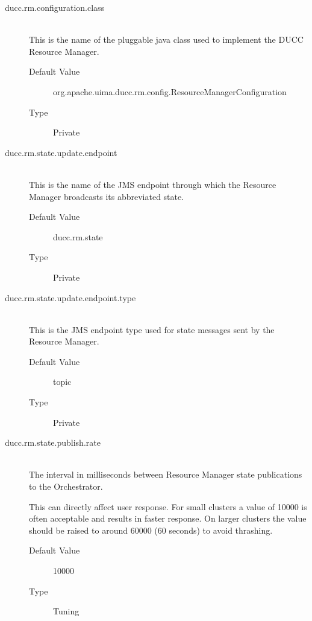     \begin{description}
        \item[ducc.rm.configuration.class] \hfill \\
          This is the name of the pluggable java class used to implement the DUCC Resource 
          Manager. 
          \begin{description}
            \item[Default Value] org.apache.uima.ducc.rm.config.ResourceManagerConfiguration 
            \item[Type] Private 
          \end{description}
          
        \item[ducc.rm.state.update.endpoint] \hfill \\
          This is the name of the JMS endpoint through which the Resource Manager broadcasts its 
          abbreviated state. 
          \begin{description}
            \item[Default Value] ducc.rm.state              
            \item[Type] Private
          \end{description} 

        \item[ducc.rm.state.update.endpoint.type] \hfill \\
          This is the JMS endpoint type used for state messages sent by the Resource Manager.
          \begin{description}            
            \item[Default Value] topic 
            \item[Type] Private 
          \end{description}
          
        \item[ducc.rm.state.publish.rate] \hfill \\
          The interval in milliseconds between Resource Manager state publications to the Orchestrator.

          This can directly affect user response.  For small clusters a value of 10000 is often acceptable
          and results in faster response.  On larger clusters the value should be raised to around
          60000 (60 seconds) to avoid thrashing.
          \begin{description}
            \item[Default Value] 10000 
            \item[Type] Tuning
          \end{description} 
                    

\end{description}
